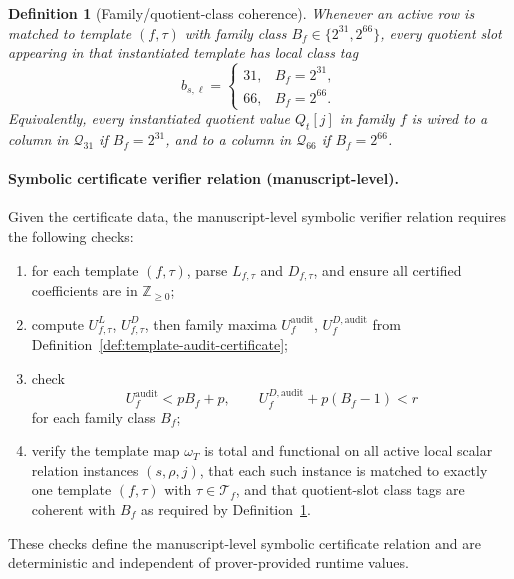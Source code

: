 ﻿\documentclass[11pt]{article}
\newtheorem{definition}[theorem]{Definition}
\newcommand{\Z}{\mathbb{Z}}
\begin{document}
\begin{definition}[Family/quotient-class coherence]
\label{def:family-quotient-class-coherence}
Whenever an active row is matched to template \((f,\tau)\) with family class
\(B_f\in\{2^{31},2^{66}\}\), every quotient slot appearing in that instantiated
template has local class tag
\[
b_{s,\ell}=
\begin{cases}
31,& B_f=2^{31},\\
66,& B_f=2^{66}.
\end{cases}
\]
Equivalently, every instantiated quotient value \(Q_t[j]\) in family \(f\) is
wired to a column in \(\mathcal Q_{31}\) if \(B_f=2^{31}\), and to a column in
\(\mathcal Q_{66}\) if \(B_f=2^{66}\).
\end{definition}

\paragraph{Symbolic certificate verifier relation (manuscript-level).}
Given the certificate data, the manuscript-level symbolic verifier relation
requires the following checks:
\begin{enumerate}[label=(\arabic*),leftmargin=2em]
    \item for each template \((f,\tau)\), parse \(L_{f,\tau}\) and \(D_{f,\tau}\),
    and ensure all certified coefficients are in \(\Z_{\ge 0}\);
    \item compute \(U_{f,\tau}^{L}\), \(U_{f,\tau}^{D}\), then family maxima
    \(U_f^{\mathrm{audit}}\), \(U_f^{D,\mathrm{audit}}\) from
    Definition~\ref{def:template-audit-certificate};
    \item check
    \[
    U_f^{\mathrm{audit}} < pB_f+p,
    \qquad
    U_f^{D,\mathrm{audit}} + p(B_f-1) < r
    \]
    for each family class \(B_f\);
    \item verify the template map \(\omega_T\) is total and functional on all
    active local scalar relation instances \((s,\rho,j)\), that each such
    instance is matched to exactly one template \((f,\tau)\) with
    \(\tau\in\mathcal T_f\), and that quotient-slot class tags are coherent
    with \(B_f\) as required by
    Definition~\ref{def:family-quotient-class-coherence}.
\end{enumerate}
These checks define the manuscript-level symbolic certificate relation and are
deterministic and independent of prover-provided runtime values.
\end{document}
